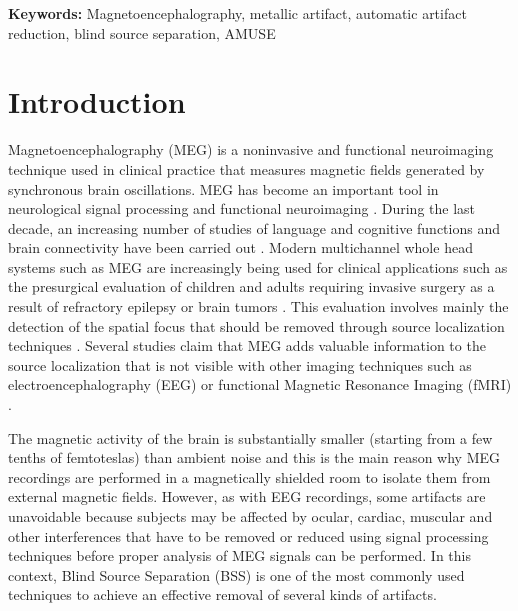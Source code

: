 \textbf{Keywords:} Magnetoencephalography, metallic artifact, automatic artifact reduction, blind source separation, AMUSE

\section{Introduction}

Magnetoencephalography (MEG) is a noninvasive and functional neuroimaging technique used in clinical practice that measures magnetic fields generated by synchronous brain oscillations. MEG has become an important tool in neurological signal processing and functional neuroimaging \citep{Hall2014,Baillet2001}. During the last decade, an increasing number of studies of language and cognitive functions and brain connectivity have been carried out \citep{Hari2012,Sakkalis2011}. Modern multichannel whole head systems such as MEG are increasingly being used for clinical applications such as the presurgical evaluation of children and adults requiring invasive surgery as a result of refractory epilepsy or brain tumors \citep{Stufflebeam2009}. This evaluation involves mainly the detection of the spatial focus that should be removed through source localization techniques \citep{Stefan2011}. Several studies claim that MEG adds valuable information to the source localization that is not visible with other imaging techniques such as electroencephalography (EEG) or functional Magnetic Resonance Imaging (fMRI) \citep{Stefan2011,Barkley2004,Sharon2007}.

The magnetic activity of the brain is substantially smaller (starting from a few tenths of femtoteslas) than ambient noise and this is the main reason why MEG recordings are performed in a magnetically shielded room to isolate them from external magnetic fields. However, as with EEG recordings, some artifacts are unavoidable because subjects may be affected by ocular, cardiac, muscular and other interferences \citep{Stufflebeam2009} that have to be removed or reduced using signal processing techniques before proper analysis of MEG signals can be performed. In this context, Blind Source Separation (BSS) is one of the most commonly used techniques to achieve an effective removal of several kinds of artifacts.

